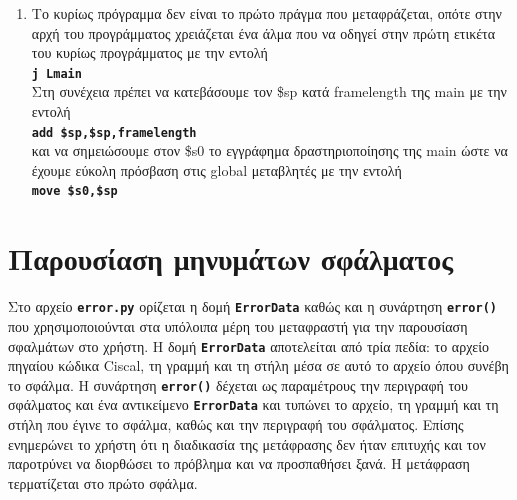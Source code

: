\documentclass[a4paper]{article}
\let\OldTexttt\texttt
\renewcommand{\texttt}[1]{\OldTexttt{\textbf{#1}}}
\begin{document}
\begin{enumerate}
    \item Το κυρίως πρόγραμμα δεν είναι το πρώτο πράγμα που μεταφράζεται,
        οπότε στην αρχή του προγράμματος χρειάζεται ένα άλμα που να οδηγεί
        στην πρώτη ετικέτα του κυρίως προγράμματος με την εντολή \\ \texttt{j
        Lmain} \\ Στη συνέχεια πρέπει να κατεβάσουμε τον \$sp κατά
        framelength της main με την εντολή \\ \texttt{add
        \$sp,\$sp,framelength} \\ και να σημειώσουμε στον \$s0 το εγγράφημα
        δραστηριοποίησης της main ώστε να έχουμε εύκολη πρόσβαση στις
        global μεταβλητές με την εντολή \\ \texttt{move \$s0,\$sp} 
\end{enumerate}

\section{Παρουσίαση μηνυμάτων σφάλματος}
Στο αρχείο \texttt{error.py} ορίζεται η δομή \texttt{ErrorData} καθώς και η
συνάρτηση \texttt{error()} που χρησιμοποιούνται στα υπόλοιπα μέρη του
μεταφραστή για την παρουσίαση σφαλμάτων στο χρήστη. Η δομή
\texttt{ErrorData} αποτελείται από τρία πεδία: το αρχείο πηγαίου κώδικα
Ciscal, τη γραμμή και τη στήλη μέσα σε αυτό το αρχείο όπου συνέβη το
σφάλμα. Η συνάρτηση \texttt{error()} δέχεται ως παραμέτρους την περιγραφή
του σφάλματος και ένα αντικείμενο \texttt{ErrorData} και τυπώνει το αρχείο,
τη γραμμή και τη στήλη που έγινε το σφάλμα, καθώς και την περιγραφή του
σφάλματος. Επίσης ενημερώνει το χρήστη ότι η διαδικασία της μετάφρασης δεν
ήταν επιτυχής και τον παροτρύνει να διορθώσει το πρόβλημα και να
προσπαθήσει ξανά. Η μετάφραση τερματίζεται στο πρώτο σφάλμα.
\end{document}
